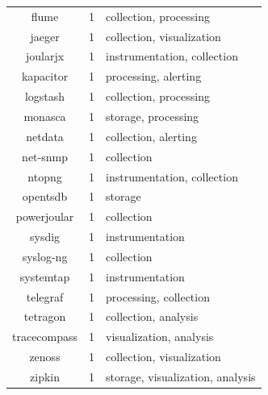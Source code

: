 \documentclass[sigconf]{acmart}
\begin{document}
\begin{table}[!htbp]
\begin{tabular}{c c p{4.5cm}}
  flume & 1 & collection, processing \\
  jaeger & 1 & collection, visualization \\
  joularjx & 1 & instrumentation, collection \\
  kapacitor & 1 & processing, alerting \\
  logstash & 1 & collection, processing \\
  monasca & 1 & storage, processing \\
  netdata & 1 & collection, alerting \\
  net-snmp & 1 & collection \\
  ntopng & 1 & instrumentation, collection \\
  opentsdb & 1 & storage \\
  powerjoular & 1 & collection \\
  sysdig & 1 & instrumentation \\
  syslog-ng & 1 & collection \\
  systemtap & 1 & instrumentation \\
  telegraf & 1 & processing, collection \\
  tetragon & 1 & collection, analysis \\
  tracecompass & 1 & visualization, analysis \\
  zenoss & 1 & collection, visualization \\
  zipkin & 1 & storage, visualization, analysis \\
  \hline
  \end{tabular}
  \smallskip
\end{table}
\end{document}
